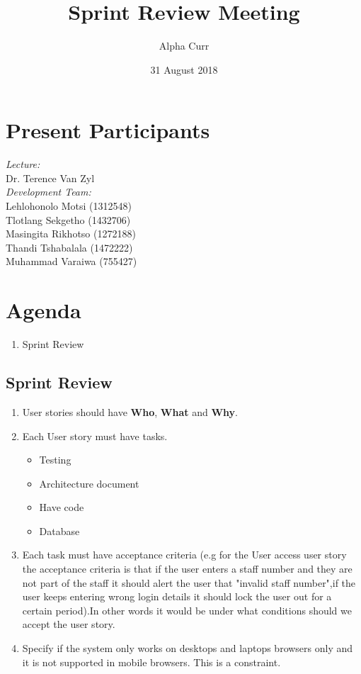\documentclass[11pt]{article}
\title{Sprint Review Meeting}
\author{Alpha Curr}
\date{31 August 2018}
\begin{document}
\maketitle

\section{Present Participants}
\textit{Lecture:}\\
Dr. Terence Van Zyl\\
\newline
\textit{Development Team:}\\
Lehlohonolo Motsi (1312548)\\
Tlotlang Sekgetho (1432706)\\
Masingita Rikhotso (1272188)\\
Thandi Tshabalala (1472222)\\
Muhammad Varaiwa (755427)

\section{Agenda}
\begin{enumerate}
\item Sprint Review
\end{enumerate}

\subsection{Sprint Review}
\begin{enumerate}[nosep, label=\textendash]
	\item User stories should have \textbf{Who}, \textbf{What} and \textbf{Why}.\\
	\item Each User story must have tasks.
		\begin{itemize}
		\item Testing
		\item Architecture document
		\item Have code
		\item Database	 
		\end{itemize}
	\item Each task must have acceptance criteria (e.g for the User access user story the acceptance criteria is that if the user enters a staff number and they are not part of the staff it should alert the user that "invalid staff number",if the user keeps entering wrong login details it should lock the user out for a certain period).In other words it would be under what conditions should we accept the user story.\\
	\item Specify if the system only works on desktops and laptops browsers only and it is not supported in mobile browsers. This is a constraint. 
\end{enumerate}
\end{document}
